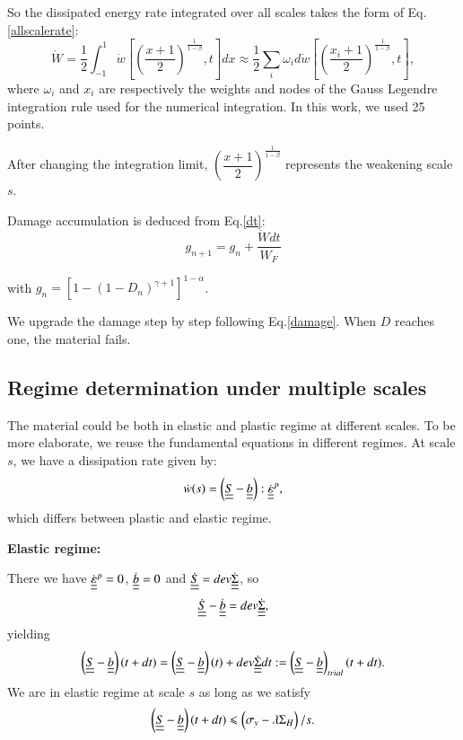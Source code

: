 \documentclass[3p,times,number,review]{elsarticle}
\begin{document}
So the dissipated energy rate integrated over all scales takes the form of Eq.\eqref{allscalerate}:
\begin{equation}
\dot{W}=\frac{1}{2}\int_{-1}^{1}\dot{w}\left[  \left( \frac{x+1}{2}\right) ^{\frac{1}{1-\beta}},t\right] dx\approx\frac{1}{2}\sum_{i}\omega_id\dot{w}\left[  \left( \frac{x_i+1}{2}\right) ^{\frac{1}{1-\beta}},t\right],
\label{allscalerate}
\end{equation}
where $\omega_i$ and $x_i$ are respectively the weights and nodes of the Gauss Legendre integration rule used for the numerical integration. In this work, we used 25 points\cite{legendre}.

After changing the integration limit, $\left( \dfrac{x+1}{2}\right) ^{\frac{1}{1-\beta}}$ represents the weakening scale $s$. 

Damage accumulation is deduced from Eq.\eqref{dt}:
\begin{equation}
g_{n+1}=g_n+\dfrac{\dot{W}dt}{W_F}
\label{damage}
\end{equation}

with $g_n=\left[ 1-\left( 1-D_{n}\right)^{\gamma+1} \right]^{1-\alpha}$.

We upgrade the damage step by step following Eq.\eqref{damage}. When $D$ reaches one, the material fails. 

\subsection{Regime determination under multiple scales}
The material could be both in elastic and plastic regime at different scales. To be more elaborate, we reuse the fundamental equations in different regimes. At scale $s$, we have a dissipation rate given by:
$$\dot{w}(s)=\left( \uline{\uline{S}}-\uline{\uline{b}}\right):\dot{\uline{\uline{\varepsilon}}}^p, $$
which differs between plastic and elastic regime.

\vspace{6pt}
\noindent
\textbf{Elastic regime:}

\vspace{6pt}
\noindent
There we have
$\dot{\uline{\uline{\varepsilon}}}^p=0$, $\dot{\uline{\uline{b}}}=0$ and $\dot{\uline{\uline{S}}}=dev\dot{\uline{\uline{\Sigma}}}$, so
$$\dot{\uline{\uline{S}}}-\dot{\uline{\uline{b}}}=dev\dot{\uline{\uline{\Sigma}}},$$ 
yielding
\begin{equation}
\left( \uline{\uline{S}}-\uline{\uline{b}}\right) (t+dt)=\left( \uline{\uline{S}}-\uline{\uline{b}}\right) (t)+dev\dot{\uline{\uline{\Sigma}}}dt:=\left(  \uline{\uline{S}}-\uline{\uline{b}}\right)_{trial}(t+dt).
\label{trial}
\end{equation}
We are in elastic regime at scale $s$ as long as we satisfy
$$\left( \uline{\uline{S}}-\uline{\uline{b}}\right) (t+dt)\leqslant\left( \sigma_y-\lambda \Sigma_H\right)/s.$$
\end{document}
